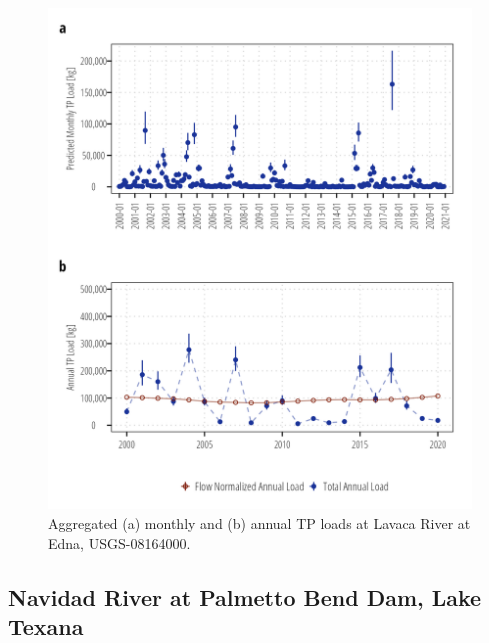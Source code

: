 \documentclass[
]{article}
\begin{document}
\begin{figure}[h]

{\centering \includegraphics{load_estimates_files/figure-pdf/tp_aggregate-08164000-1.png}

}

\caption{Aggregated (a) monthly and (b) annual TP loads at Lavaca River
at Edna, USGS-08164000.}

\end{figure}

\clearpage

\hypertarget{navidad-river-at-palmetto-bend-dam-lake-texana}{%
\subsection{Navidad River at Palmetto Bend Dam, Lake
Texana}\label{navidad-river-at-palmetto-bend-dam-lake-texana}}
\end{document}
